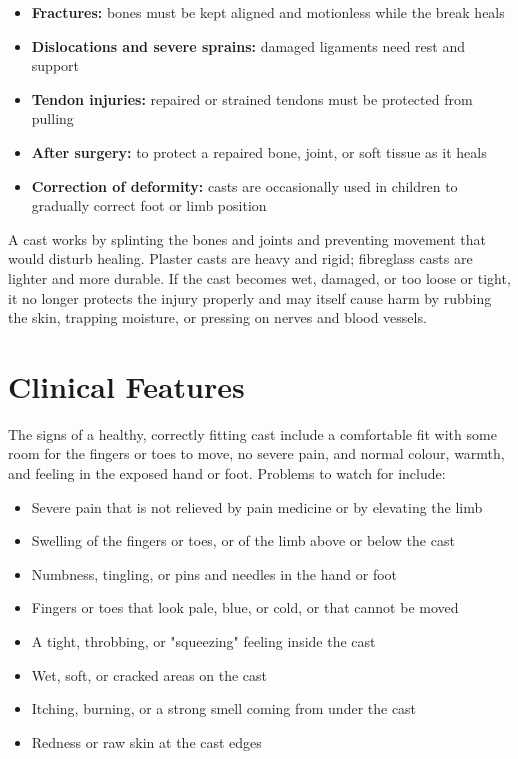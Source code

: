 \begin{itemize}
    \item \textbf{Fractures:} bones must be kept aligned and motionless while the break heals
    \item \textbf{Dislocations and severe sprains:} damaged ligaments need rest and support
    \item \textbf{Tendon injuries:} repaired or strained tendons must be protected from pulling
    \item \textbf{After surgery:} to protect a repaired bone, joint, or soft tissue as it heals
    \item \textbf{Correction of deformity:} casts are occasionally used in children to gradually correct foot or limb position
\end{itemize}

A cast works by splinting the bones and joints and preventing movement that would disturb healing. Plaster casts are heavy and rigid; fibreglass casts are lighter and more durable. If the cast becomes wet, damaged, or too loose or tight, it no longer protects the injury properly and may itself cause harm by rubbing the skin, trapping moisture, or pressing on nerves and blood vessels.

\section*{Clinical Features}
The signs of a healthy, correctly fitting cast include a comfortable fit with some room for the fingers or toes to move, no severe pain, and normal colour, warmth, and feeling in the exposed hand or foot. Problems to watch for include:

\begin{itemize}
    \item Severe pain that is not relieved by pain medicine or by elevating the limb
    \item Swelling of the fingers or toes, or of the limb above or below the cast
    \item Numbness, tingling, or pins and needles in the hand or foot
    \item Fingers or toes that look pale, blue, or cold, or that cannot be moved
    \item A tight, throbbing, or "squeezing" feeling inside the cast
    \item Wet, soft, or cracked areas on the cast
    \item Itching, burning, or a strong smell coming from under the cast
    \item Redness or raw skin at the cast edges
\end{itemize}

